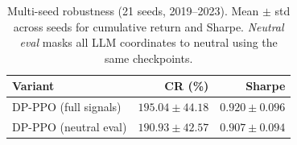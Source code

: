 \begin{table}[htbp]
\centering
\caption{Multi-seed robustness (21 seeds, 2019--2023). Mean $\pm$ std across seeds for cumulative return and Sharpe. \textit{Neutral eval} masks all LLM coordinates to neutral using the same checkpoints.}
\label{tab:seed_robust}
\begin{tabular}{lrr}
\toprule
\textbf{Variant} & \textbf{CR (\%)} & \textbf{Sharpe} \\
\midrule
DP-PPO (full signals) & $195.04 \pm 44.18$ & $0.920 \pm 0.096$ \\
DP-PPO (neutral eval) & $190.93 \pm 42.57$ & $0.907 \pm 0.094$ \\
\bottomrule
\end{tabular}
\end{table}
